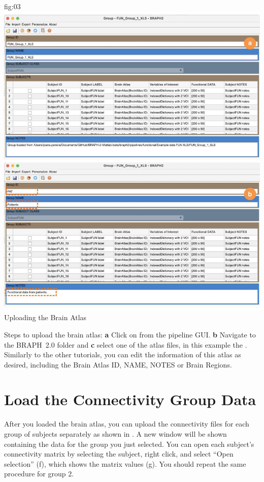 \documentclass[justified]{tufte-handout}
\begin{document}
{
	{fig:03}
	{
	\includegraphics{fig03.jpg}
	}
	{Uploading the Brain Atlas}
	{
	Steps to upload the brain atlas:
	{\bf a} Click on  from the pipeline GUI.
	{\bf b} Navigate to the BRAPH~2.0 folder  and {\bf c} select one of the atlas files, in this example the . Similarly to the other tutorials, you can edit the information of this atlas as desired, including the Brain Atlas ID, NAME, NOTES or Brain Regions.

\section{Load the Connectivity Group Data}

After you loaded the brain atlas, you can upload the connectivity files for each group of subjects separately as shown in . A new window will be shown containing the data for the group you just selected. You can open each subject’s connectivity matrix by selecting
the subject, right click, and select “Open selection” (f), which shows the matrix values (g).	You should repeat the same procedure for group 2.
	
}}
\end{document}
